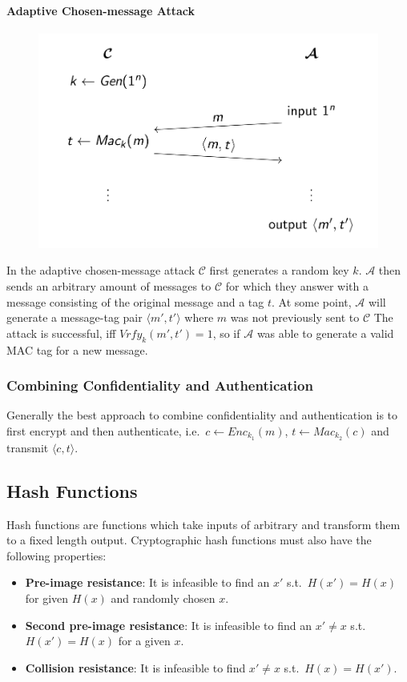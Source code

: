 \paragraph{Adaptive Chosen-message Attack}
\begin{figure}[H]
  \centering
  \includegraphics[width=.7\textwidth]{figures/adaptive_chosen-message_attack.png}
\end{figure}
In the adaptive chosen-message attack $\mathcal{C}$ first generates a random key $k$.
$\mathcal{A}$ then sends an arbitrary amount of messages to $\mathcal{C}$ for which they answer with a message consisting of the original message and a tag $t$.
At some point, $\mathcal{A}$ will generate a message-tag pair $\langle m',t' \rangle$ where $m$ was not previously sent to $\mathcal{C}$
The attack is successful, iff $Vrfy_k(m',t') = 1$, so if $\mathcal{A}$ was able to generate a valid MAC tag for a new message.

\subsubsection{Combining Confidentiality and Authentication}
Generally the best approach to combine confidentiality and authentication is to first encrypt and then authenticate, i.e.\ $c \leftarrow Enc_{k_1}(m)$, $t \leftarrow Mac_{k_2}(c)$ and transmit $\langle c,t \rangle$.

\subsection{Hash Functions}
Hash functions are functions which take inputs of arbitrary and transform them to a fixed length output.
Cryptographic hash functions must also have the following properties:
\begin{itemize}
  \item \textbf{Pre-image resistance}: It is infeasible to find an $x'$ s.t.\ $H(x') = H(x)$ for given $H(x)$ and randomly chosen $x$.
  \item \textbf{Second pre-image resistance}: It is infeasible to find an $x' \neq x$ s.t.\ $H(x') = H(x)$ for a given $x$.
  \item \textbf{Collision resistance}: It is infeasible to find $x' \neq x$ s.t.\ $H(x) = H(x')$.
\end{itemize}

